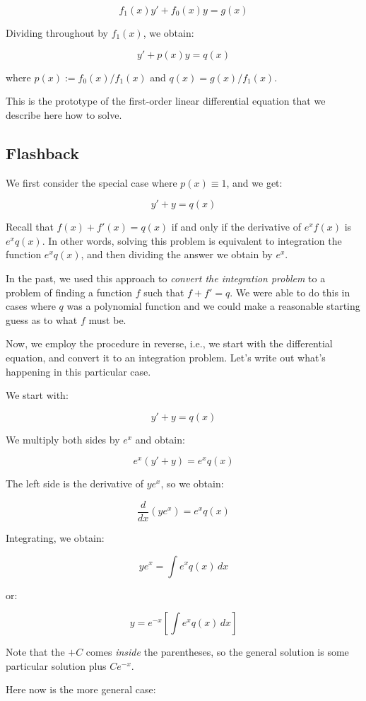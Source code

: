 \documentclass{amsart}
\begin{document}
$$f_1(x)y' + f_0(x)y  = g(x)$$

Dividing throughout by $f_1(x)$, we obtain:

$$y' + p(x)y = q(x)$$

where $p(x) := f_0(x)/f_1(x)$ and $q(x) = g(x)/f_1(x)$.

This is the prototype of the first-order linear differential equation
that we describe here how to solve.

\subsection{Flashback}

We first consider the special case where $p(x) \equiv 1$, and we get:

$$y' + y = q(x)$$

Recall that $f(x) + f'(x) = q(x)$ if and only if the derivative of
$e^xf(x)$ is $e^xq(x)$. In other words, solving this problem is
equivalent to integration the function $e^xq(x)$, and then dividing
the answer we obtain by $e^x$.

In the past, we used this approach to {\em convert the integration
problem} to a problem of finding a function $f$ such that $f + f' =
q$. We were able to do this in cases where $q$ was a polynomial
function and we could make a reasonable starting guess as to what $f$
must be.

Now, we employ the procedure in reverse, i.e., we start with the
differential equation, and convert it to an integration problem. Let's
write out what's happening in this particular case.

We start with:

$$y' + y = q(x)$$

We multiply both sides by $e^x$ and obtain:

$$e^x(y' + y) = e^xq(x)$$

The left side is the derivative of $ye^x$, so we obtain:

$$\frac{d}{dx}(ye^x) = e^xq(x)$$

Integrating, we obtain:

$$ye^x = \int e^xq(x) \, dx$$

or:

$$y = e^{-x}\left[\int e^x q(x) \, dx\right]$$

Note that the $+C$ comes {\em inside} the parentheses, so the general
solution is some particular solution plus $Ce^{-x}$.

Here now is the more general case:
\end{document}
